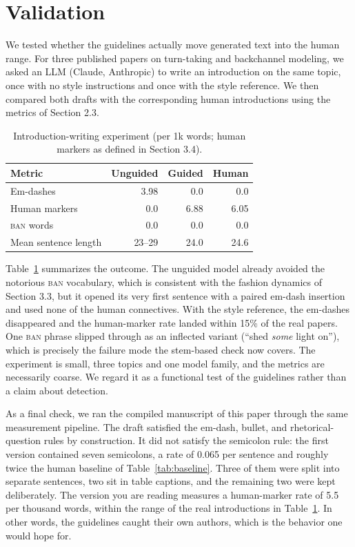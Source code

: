 \documentclass[a4paper,10pt,twocolumn]{article}
\begin{document}
\section{Validation}

We tested whether the guidelines actually move generated text into the human range. For three published papers on turn-taking and backchannel modeling, we asked an LLM (Claude, Anthropic) to write an introduction on the same topic, once with no style instructions and once with the style reference. We then compared both drafts with the corresponding human introductions using the metrics of Section 2.3.

\begin{table}[t]
\centering
\caption{Introduction-writing experiment (per 1k words; human markers as defined in Section 3.4).}
\label{tab:valid}
\small
\begin{tabular}{lrrr}
\toprule
Metric & Unguided & Guided & Human \\
\midrule
Em-dashes & 3.98 & 0.0 & 0.0 \\
Human markers & 0.0 & 6.88 & 6.05 \\
\textsc{ban} words & 0.0 & 0.0 & 0.0 \\
Mean sentence length & 23--29 & 24.0 & 24.6 \\
\bottomrule
\end{tabular}
\end{table}

Table~\ref{tab:valid} summarizes the outcome. The unguided model already avoided the notorious \textsc{ban} vocabulary, which is consistent with the fashion dynamics of Section 3.3, but it opened its very first sentence with a paired em-dash insertion and used none of the human connectives. With the style reference, the em-dashes disappeared and the human-marker rate landed within 15\% of the real papers. One \textsc{ban} phrase slipped through as an inflected variant (``shed \emph{some} light on''), which is precisely the failure mode the stem-based check now covers. The experiment is small, three topics and one model family, and the metrics are necessarily coarse. We regard it as a functional test of the guidelines rather than a claim about detection.

As a final check, we ran the compiled manuscript of this paper through the same measurement pipeline. The draft satisfied the em-dash, bullet, and rhetorical-question rules by construction. It did not satisfy the semicolon rule: the first version contained seven semicolons, a rate of 0.065 per sentence and roughly twice the human baseline of Table~\ref{tab:baseline}. Three of them were split into separate sentences, two sit in table captions, and the remaining two were kept deliberately. The version you are reading measures a human-marker rate of 5.5 per thousand words, within the range of the real introductions in Table~\ref{tab:valid}. In other words, the guidelines caught their own authors, which is the behavior one would hope for.
\end{document}

